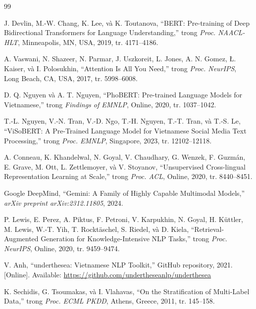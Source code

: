 \documentclass[12pt, a4paper]{report}
\begin{document}
\begin{thebibliography}{99}

J. Devlin, M.-W. Chang, K. Lee, và K. Toutanova,
``BERT: Pre-training of Deep Bidirectional Transformers for Language Understanding,''
trong \textit{Proc. NAACL-HLT}, Minneapolis, MN, USA, 2019, tr. 4171--4186.

A. Vaswani, N. Shazeer, N. Parmar, J. Uszkoreit, L. Jones, A. N. Gomez,
Ł. Kaiser, và I. Polosukhin,
``Attention Is All You Need,''
trong \textit{Proc. NeurIPS}, Long Beach, CA, USA, 2017, tr. 5998--6008.

D. Q. Nguyen và A. T. Nguyen,
``PhoBERT: Pre-trained Language Models for Vietnamese,''
trong \textit{Findings of EMNLP}, Online, 2020, tr. 1037--1042.

T.-L. Nguyen, V.-N. Tran, V.-D. Ngo, T.-H. Nguyen, T.-T. Tran, và T.-S. Le,
``ViSoBERT: A Pre-Trained Language Model for Vietnamese Social Media Text Processing,''
trong \textit{Proc. EMNLP}, Singapore, 2023, tr. 12102--12118.

A. Conneau, K. Khandelwal, N. Goyal, V. Chaudhary, G. Wenzek, F. Guzmán,
E. Grave, M. Ott, L. Zettlemoyer, và V. Stoyanov,
``Unsupervised Cross-lingual Representation Learning at Scale,''
trong \textit{Proc. ACL}, Online, 2020, tr. 8440--8451.

Google DeepMind,
``Gemini: A Family of Highly Capable Multimodal Models,''
\textit{arXiv preprint arXiv:2312.11805}, 2024.

P. Lewis, E. Perez, A. Piktus, F. Petroni, V. Karpukhin, N. Goyal,
H. Küttler, M. Lewis, W.-T. Yih, T. Rocktäschel, S. Riedel, và D. Kiela,
``Retrieval-Augmented Generation for Knowledge-Intensive NLP Tasks,''
trong \textit{Proc. NeurIPS}, Online, 2020, tr. 9459--9474.

V. Anh,
``underthesea: Vietnamese NLP Toolkit,''
GitHub repository, 2021.
[Online]. Available: \url{https://github.com/undertheseanlp/underthesea}

K. Sechidis, G. Tsoumakas, và I. Vlahavas,
``On the Stratification of Multi-Label Data,''
trong \textit{Proc. ECML PKDD}, Athens, Greece, 2011, tr. 145--158.


\end{thebibliography}
\end{document}
